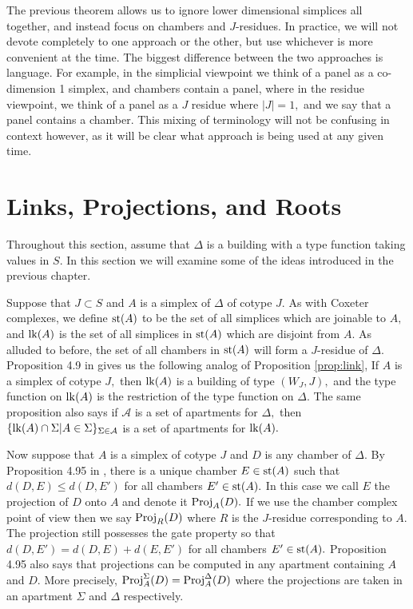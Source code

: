 \documentclass[class=book, crop=false,12 pt]{standalone}
\begin{document}
The previous theorem allows us to ignore lower dimensional simplices all together, and instead focus on chambers and $J$-residues. In practice, we will not devote completely to one approach or the other, but use whichever is more convenient at the time. The biggest difference between the two approaches is language. For example, in the simplicial viewpoint we think of a panel as a co-dimension 1 simplex, and chambers contain a panel, where in the residue viewpoint, we think of a panel as a $J$ residue where $|J|=1,$ and we say that a panel contains a chamber. This mixing of terminology will not be confusing in context however, as it will be clear what approach is being used at any given time.


\section{Links, Projections, and Roots}
Throughout this section, assume that $\Delta$ is a building with a type function taking values in $S.$ In this section we will examine some of the ideas introduced in the previous chapter.

Suppose that $J\subset S$ and $A$ is a simplex of $\Delta$ of cotype $J.$ As with Coxeter complexes, we define $\mathrm{st}(A)$ to be the set of all simplices which are joinable to $A,$ and $\mathrm{lk}(A)$ is the set of all simplices in $\mathrm{st}(A)$ which are disjoint from $A.$ As alluded to before, the set of all chambers in $\mathrm{st}(A)$ will form a $J$-residue of $\Delta.$ Proposition 4.9 in \cite{buildings} gives us the following analog of Proposition \ref{prop:link}, If $A$ is a simplex of cotype $J,$ then $\mathrm{lk}(A)$ is a building of type $(W_J,J),$ and the type function on $\mathrm{lk}(A)$ is the restriction of the type function on $\Delta.$ The same proposition also says if $\mathcal{A}$ is a set of apartments for $\Delta,$ then $\{\mathrm{lk}(A)\cap \Sigma|A\in \Sigma\}_{\Sigma\in \mathcal{A}}$ is a set of apartments for $\mathrm{lk}(A).$ 

Now suppose that $A$ is a simplex of cotype $J$ and $D$ is any chamber of $\Delta.$ By Proposition 4.95 in \cite{buildings}, there is a unique chamber $E\in \mathrm{st}(A)$ such that $d(D,E)\le d(D,E')$ for all chambers $E'\in \mathrm{st}(A).$ In this case we call $E$ the projection of $D$ onto $A$ and denote it $\mathrm{Proj}_A(D).$ If we use the chamber complex point of view then we say $\mathrm{Proj}_R(D)$ where $R$ is the $J$-residue corresponding to $A.$ The projection still possesses the gate property so that $d(D,E')=d(D,E)+d(E,E')$ for all chambers $E'\in \mathrm{st}(A).$ Proposition 4.95 also says that projections can be computed in any apartment containing $A$ and $D.$ More precisely, $\mathrm{Proj}_A^\Sigma (D)=\mathrm{Proj}_A^\Delta(D)$ where the projections are taken in an apartment $\Sigma$ and $\Delta$ respectively.
\end{document}
